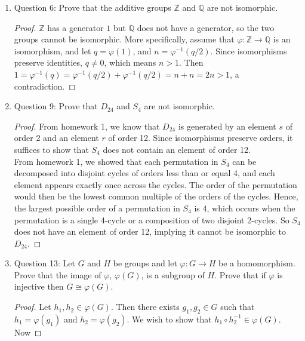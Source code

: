 \documentclass{article}
\begin{document}
\begin{enumerate}
\begin{enumerate}
      \item Question 6: Prove that the additive groups $\mathbb{Z}$ and
        $\mathbb{Q}$ are not isomorphic.

        \begin{proof}
          $\mathbb{Z}$ has a generator $1$ but $\mathbb{Q}$ does not have a
          generator, so the two groups cannot be isomorphic. More
          specifically, assume that
          $\varphi:\mathbb{Z}\rightarrow\mathbb{Q}$ is an isomorphism, and
          let $q=\varphi(1)$, and $n=\varphi^{-1}(q/2)$. Since isomorphisms
          preserve identities, $q\neq0$, which means $n>1$. Then
          $1=\varphi^{-1}(q)=\varphi^{-1}(q/2)+\varphi^{-1}(q/2)=n+n=2n>1$,
          a contradiction.
        \end{proof}

      \item Question 9: Prove that $D_{24}$ and $S_4$ are not isomorphic.
        \begin{proof}
          From homework 1, we know that $D_{24}$ is generated by an element
          $s$ of order 2 and an element $r$ of order 12. Since isomorphisms
          preserve orders, it suffices to show that $S_4$ does not contain
          an element of order 12. \\

          From homework 1, we showed that each permutation in $S_4$ can be
          decomposed into disjoint cycles of orders less than or equal 4,
          and each element appears exactly once across the cycles. The
          order of the permutation would then be the lowest common multiple
          of the orders of the cycles. Hence, the largest possible order of
          a permutation in $S_4$ is 4, which occurs when the permutation is
          a single 4-cycle or a composition of two disjoint 2-cycles. So
          $S_4$ does not have an element of order 12, implying it cannot be
          isomorphic to $D_{24}$.
        \end{proof}

      \item Question 13: Let $G$ and $H$ be groups and let
        $\varphi:G\rightarrow H$ be a homomorphism. Prove that the image of
        $\varphi$, $\varphi(G)$, is a subgroup of $H$. Prove that if
        $\varphi$ is injective then $G\cong\varphi(G)$. 

        \begin{proof}
          Let $h_1,h_2\in\varphi(G)$. Then there exists $g_1,g_2\in G$ such
          that $h_1=\varphi(g_1)$ and $h_2=\varphi(g_2)$. We wish to show
          that $h_1\circ h_2^{-1}\in \varphi(G)$. Now 


\end{proof}
\end{enumerate}
\end{enumerate}
\end{document}
